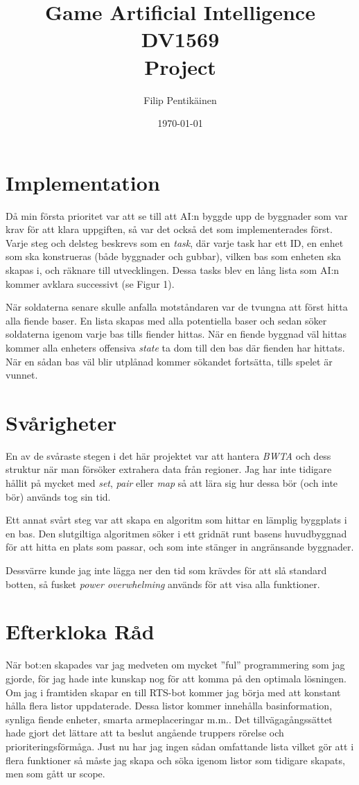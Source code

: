 \documentclass[a4paper,11pt]{article}
\begin{document}
\title{Game Artificial Intelligence \\ DV1569 \\ Project}
\author{Filip Pentikäinen}
\date{\today}
\maketitle

\section{Implementation}
Då min första prioritet var att se till att AI:n byggde upp de byggnader som var krav för att klara uppgiften, så var det också det som implementerades först. Varje steg och delsteg beskrevs som en \textit{task}, där varje task har ett ID, en enhet som ska konstrueras (både byggnader och gubbar), vilken bas som enheten ska skapas i, och räknare till utvecklingen. Dessa tasks blev en lång lista som AI:n kommer avklara successivt (se Figur 1).

När soldaterna senare skulle anfalla motståndaren var de tvungna att först hitta alla fiende baser. En lista skapas med alla potentiella baser och sedan söker soldaterna igenom varje bas tills fiender hittas. När en fiende byggnad väl hittas kommer alla enheters offensiva \textit{state} ta dom till den bas där fienden har hittats. När en sådan bas väl blir utplånad kommer sökandet fortsätta, tills spelet är vunnet.

\section{Svårigheter}
En av de svåraste stegen i det här projektet var att hantera \textit{BWTA} och dess struktur när man försöker extrahera data från regioner. Jag har inte tidigare hållit på mycket med \textit{set}, \textit{pair} eller \textit{map} så att lära sig hur dessa bör (och inte bör) används tog sin tid. 

Ett annat svårt steg var att skapa en algoritm som hittar en lämplig byggplats i en bas. Den slutgiltiga algoritmen söker i ett gridnät runt basens huvudbyggnad för att hitta en plats som passar, och som inte stänger in angränsande byggnader.

Dessvärre kunde jag inte lägga ner den tid som krävdes för att slå standard botten, så fusket \textit{power overwhelming} används för att visa alla funktioner.

\section{Efterkloka Råd}
När bot:en skapades var jag medveten om mycket ''ful'' programmering som jag gjorde, för jag hade inte kunskap nog för att komma på den optimala lösningen. Om jag i framtiden skapar en till RTS-bot kommer jag börja med att konstant hålla flera listor uppdaterade. Dessa listor kommer innehålla basinformation, synliga fiende enheter, smarta armeplaceringar m.m.. Det tillvägagångssättet hade gjort det lättare att ta beslut angående truppers rörelse och prioriteringsförmåga. Just nu har jag ingen sådan omfattande lista vilket gör att i flera funktioner så måste jag skapa och söka igenom listor som tidigare skapats, men som gått ur scope.
\end{document}
